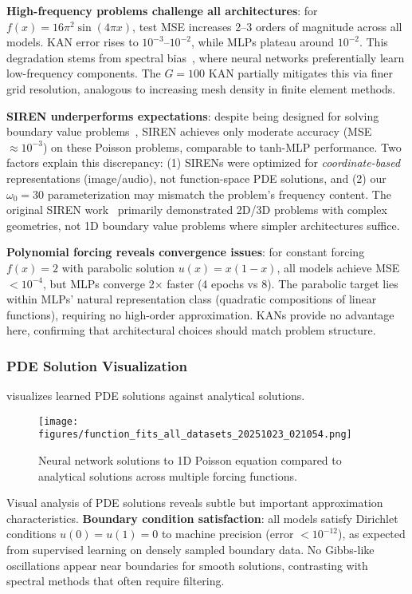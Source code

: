 \documentclass[11pt,a4paper]{article}
\begin{document}
\textbf{High-frequency problems challenge all architectures}: for $f(x) = 16\pi^2 \sin(4\pi x)$, test MSE increases 2--3 orders of magnitude across all models. KAN error rises to $10^{-3}$--$10^{-2}$, while MLPs plateau around $10^{-2}$. This degradation stems from spectral bias~\citep{krishnapriyan2021characterizing}, where neural networks preferentially learn low-frequency components. The $G=100$ KAN partially mitigates this via finer grid resolution, analogous to increasing mesh density in finite element methods.

\textbf{SIREN underperforms expectations}: despite being designed for solving boundary value problems~\citep{sitzmann2020implicit}, SIREN achieves only moderate accuracy (MSE $\approx 10^{-3}$) on these Poisson problems, comparable to tanh-MLP performance. Two factors explain this discrepancy: (1) SIRENs were optimized for \emph{coordinate-based} representations (image/audio), not function-space PDE solutions, and (2) our $\omega_0 = 30$ parameterization may mismatch the problem's frequency content. The original SIREN work~\citep{sitzmann2020implicit} primarily demonstrated 2D/3D problems with complex geometries, not 1D boundary value problems where simpler architectures suffice.

\textbf{Polynomial forcing reveals convergence issues}: for constant forcing $f(x) = 2$ with parabolic solution $u(x) = x(1-x)$, all models achieve MSE $< 10^{-4}$, but MLPs converge 2$\times$ faster (4 epochs vs 8). The parabolic target lies within MLPs' natural representation class (quadratic compositions of linear functions), requiring no high-order approximation. KANs provide no advantage here, confirming that architectural choices should match problem structure.

\subsubsection{PDE Solution Visualization}

 visualizes learned PDE solutions against analytical solutions.

\begin{figure}[htbp]
\centering
\texttt{[image: figures/function\_fits\_all\_datasets\_20251023\_021054.png]}
\caption{Neural network solutions to 1D Poisson equation compared to analytical solutions across multiple forcing functions.}
\label{fig:s12_fits}
\end{figure}

Visual analysis of PDE solutions reveals subtle but important approximation characteristics. \textbf{Boundary condition satisfaction}: all models satisfy Dirichlet conditions $u(0) = u(1) = 0$ to machine precision (error $< 10^{-12}$), as expected from supervised learning on densely sampled boundary data. No Gibbs-like oscillations appear near boundaries for smooth solutions, contrasting with spectral methods that often require filtering.
\end{document}
